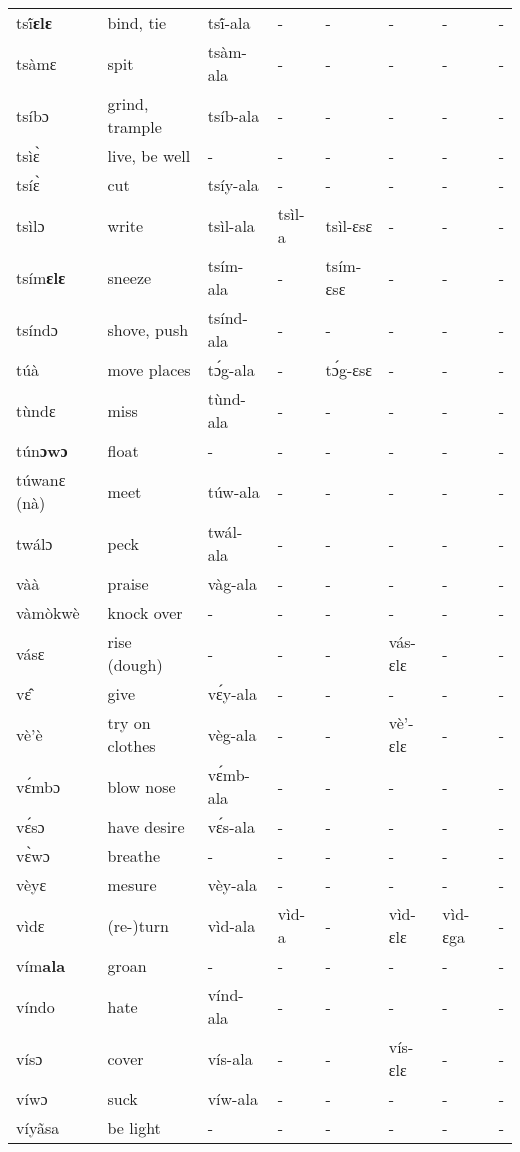\begin{sidewaystable}
\begin{longtable}{lp{3.5cm}llllll}
tsĩ́{\bfseries ɛlɛ} & bind, tie & tsĩ́-ala & - & - &  - & - &  - \\
tsàmɛ & spit & tsàm-ala & - & - & -  & - & - \\
tsíbɔ & grind, trample & tsíb-ala & - & - & - & - & - \\
tsìɛ̀ & live, be well & - & - & - & -  & - & - \\
tsíɛ̀ & cut & tsíy-ala & - & - & - & - & - \\
tsìlɔ & write & tsìl-ala & tsìl-a & tsìl-ɛsɛ & - & - & - \\
tsím{\bfseries ɛlɛ} & sneeze & tsím-ala & - & tsím-ɛsɛ & - & - & - \\
 tsíndɔ &  shove, push & tsínd-ala & - & - & - & - & - \\
túà & move places & tɔ́g-ala & - & tɔ́g-ɛsɛ & - &  - & - \\
tùndɛ & miss & tùnd-ala & - & - & - & - & - \\
tún{\bfseries ɔwɔ} & float & - & - & - & - & - & - \\   
túwanɛ (nà) & meet & túw-ala & - & - & - & - & - \\
twálɔ & peck & twál-ala & - & - & - & - & - \\
vàà & praise & vàg-ala & - & - & -  & - & - \\
vàmòkwè & knock over & -  & - & - & - & - & - \\
vásɛ & rise (dough) & - & - & - &  vás-ɛlɛ & - & - \\
vɛ̂ & give & vɛ́y-ala & - & - & - & - & - \\
vè'è & try on clothes & vèg-ala & - & - & vè'-ɛlɛ & - & - \\
vɛ́mbɔ & blow nose & vɛ́mb-ala & - & - & - & - & - \\
vɛ́sɔ & have desire & vɛ́s-ala & - & - & - & - & - \\
vɛ̀wɔ & breathe & - & - & - & - & - & - \\
vèyɛ & mesure & vèy-ala & - & - & -  & -  & - \\
vìdɛ & (re-)turn & vìd-ala & vìd-a & - & vìd-ɛlɛ & vìd-ɛga & - \\
vím{\bfseries ala} & groan & - & - & - & - & - & - \\
víndo & hate & vínd-ala & - & - & - & - & - \\
vísɔ & cover & vís-ala & - & - &  vís-ɛlɛ & - & - \\
víwɔ & suck & víw-ala & - & - & - & - & - \\
víyãsa & be light & - & - & - & - & - & - \\

\end{longtable}
\end{sidewaystable}
